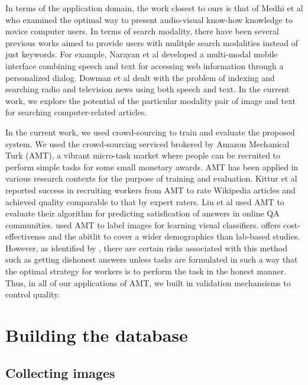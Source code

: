 \documentclass{www2010-submission}
\begin{document}
In terms of the application domain, the work closest to ours is that
of Medhi et al \cite{Medhi} who examined the optimal way to present
audio-visual know-how knowledge to novice computer users.  In terms of
search modality, there have been several previous works aimed to
provide users with mulitple search modalities instead of just
keywords. For example, Narayan et al \cite{Narayan} developed a
multi-modal mobile interface combining speech and text for accessing
web information through a personalized dialog.  Dowman et al
\cite{Dowman} dealt with the problem of indexing and searching radio
and television news using both speech and text. In the current work,
we explore the potential of the particular modality pair of image and
text for searching computer-related articles.


In the current work, we used crowd-sourcing to train and evaluate the
proposed system.  We used the crowd-sourcing serviced brokered by
Amazon Mechanical Turk (AMT), a vibrant micro-task market where people
can be recruited to perform simple tasks for some small monetary
awards. AMT has been applied in various research contexts for the
purpose of training and evaluation. Kittur et al \cite{Kittur}
reported success in recruiting workers from AMT to rate Wikipedia
articles and achieved quality comparable to that by expert raters.
Liu et al \cite{Liu} used AMT to evaluate their algorithm for
predicting satisfication of answers in online QA
communities. \cite{Vijayanarasimha} used AMT to label images for
learning visual classifiers.  offers cost-effectivenss and the abitlit
to cover a wider demographics than lab-based studies. However, as
identified by \cite{Kittur}, there are certain risks associated with
this method such as getting dishonest answers unless tasks are
formulated in such a way that the optimal strategy for workers is to
perform the task in the honest manner. Thus, in all of our
applications of AMT, we built in validation mechansisms to control
quality.

\section{Building the database}

\subsection{Collecting images}
\end{document}

